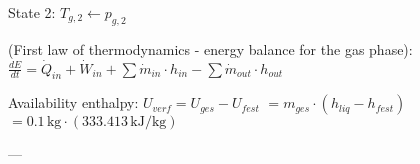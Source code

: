 State 2:  
\( T_{g,2} \leftarrow p_{g,2} \)  

(First law of thermodynamics - energy balance for the gas phase):  
\( \frac{dE}{dt} = \dot{Q}_{in} + \dot{W}_{in} + \sum \dot{m}_{in} \cdot h_{in} - \sum \dot{m}_{out} \cdot h_{out} \)  

Availability enthalpy:  
\( U_{verf} = U_{ges} - U_{fest} \)  
\( = m_{ges} \cdot (h_{liq} - h_{fest}) \)  
\( = 0.1 \, \text{kg} \cdot (333.413 \, \text{kJ/kg}) \)  

---